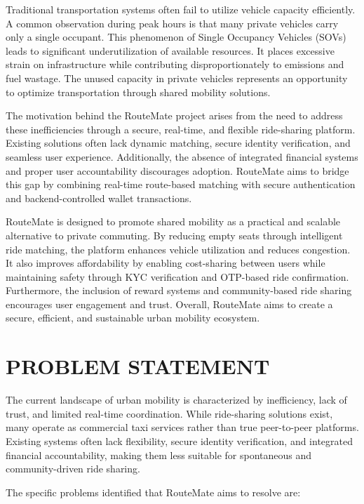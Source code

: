 \documentclass[10pt,a4paper]{report}
\begin{document}
\large\justify Traditional transportation systems often fail to utilize vehicle capacity efficiently. A common observation during peak hours is that many private vehicles carry only a single occupant. This phenomenon of Single Occupancy Vehicles (SOVs) leads to significant underutilization of available resources. It places excessive strain on infrastructure while contributing disproportionately to emissions and fuel wastage. The unused capacity in private vehicles represents an opportunity to optimize transportation through shared mobility solutions.

\large\justify The motivation behind the RouteMate project arises from the need to address these inefficiencies through a secure, real-time, and flexible ride-sharing platform. Existing solutions often lack dynamic matching, secure identity verification, and seamless user experience. Additionally, the absence of integrated financial systems and proper user accountability discourages adoption. RouteMate aims to bridge this gap by combining real-time route-based matching with secure authentication and backend-controlled wallet transactions.

\large\justify RouteMate is designed to promote shared mobility as a practical and scalable alternative to private commuting. By reducing empty seats through intelligent ride matching, the platform enhances vehicle utilization and reduces congestion. It also improves affordability by enabling cost-sharing between users while maintaining safety through KYC verification and OTP-based ride confirmation. Furthermore, the inclusion of reward systems and community-based ride sharing encourages user engagement and trust. Overall, RouteMate aims to create a secure, efficient, and sustainable urban mobility ecosystem.

\section{\textbf{PROBLEM STATEMENT}}
\large\justify
The current landscape of urban mobility is characterized by inefficiency, lack of trust, and limited real-time coordination. While ride-sharing solutions exist, many operate as commercial taxi services rather than true peer-to-peer platforms. Existing systems often lack flexibility, secure identity verification, and integrated financial accountability, making them less suitable for spontaneous and community-driven ride sharing.

\large\justify The specific problems identified that RouteMate aims to resolve are:
\end{document}

